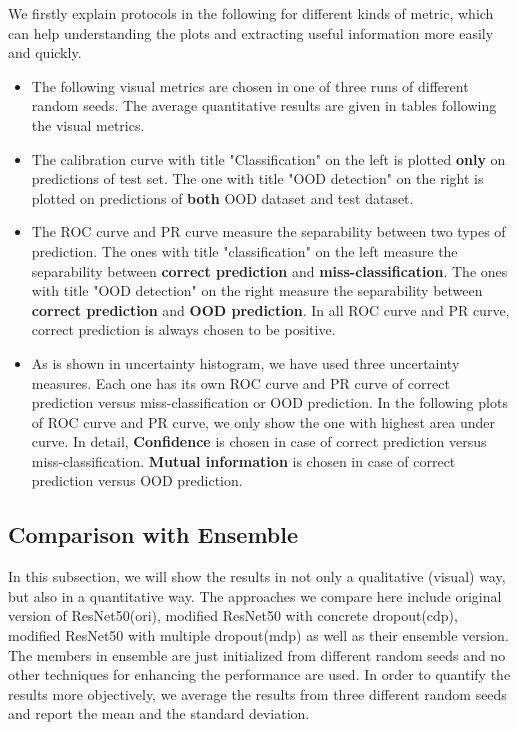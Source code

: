 We firstly explain protocols in the following for different kinds of metric, which can help understanding the plots and extracting useful information more easily and quickly.  
\begin{itemize}
	\item The following visual metrics are chosen in one of three runs of different random seeds. The average quantitative results are given in tables following the visual metrics.
	\item The calibration curve with title "Classification" on the left is plotted \textbf{only} on predictions of test set. The one with title "OOD detection" on the right is plotted on predictions of \textbf{both} OOD dataset and test dataset.
	\item The ROC curve and PR curve measure the separability between two types of prediction.
	The ones with title "classification" on the left measure the separability between \textbf{correct prediction} and \textbf{miss-classification}. The ones with title "OOD detection" on the right measure the separability between \textbf{correct prediction} and \textbf{OOD prediction}. In all ROC curve and PR curve, correct prediction is always chosen to be positive.
	\item As is shown in uncertainty histogram, we have used three uncertainty measures. Each one has its own ROC curve and PR curve of correct prediction versus miss-classification or OOD prediction. In the following plots of ROC curve and PR curve, we only show the one with highest area under curve. In detail, \textbf{Confidence} is chosen in case of correct prediction versus miss-classification. \textbf{Mutual information} is chosen in case of correct prediction versus OOD prediction.
\end{itemize}   

\subsection{Comparison with Ensemble}
In this subsection, we will show the results in not only a qualitative (visual) way, but also in a quantitative way. The approaches we compare here include original version of ResNet50(ori), modified ResNet50 with concrete dropout(cdp), modified ResNet50 with multiple dropout(mdp) as well as their ensemble version. The members in ensemble are just initialized from different random seeds and no other techniques for enhancing the performance are used. In order to quantify the results more objectively, we average the results from three different random seeds and report the mean and the standard deviation.
